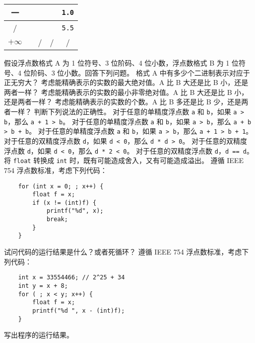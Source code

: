 \begin{problems}
\begin{table}[H]
\begin{tabular}{|c|c|c|c|c|}
				一 &  &  &  & \texttt{1.0} \\ \hline
				/ &  &  &  & \texttt{5.5} \\ \hline
				$+\infty$ &  & / & / & / \\ \hline
			\end{tabular}
		\end{table}
		\pro 假设浮点数格式 A 为 1 位符号、3 位阶码、4 位小数，浮点数格式 B 为 1 位符号、4 位阶码、3 位小数。回答下列问题。
			\qn 格式 A 中有多少个二进制表示对应于正无穷大？
			\qn 考虑能精确表示的实数的最大绝对值。A 比 B 大还是比 B 小，还是两者一样？
			\qn 考虑能精确表示的实数的最小非零绝对值。A 比 B 大还是比 B 小，还是两者一样？
			\qn 考虑能精确表示的实数的个数。A 比 B 多还是比 B 少，还是两者一样？
		\pro 判断下列说法的正确性。
			\qn 对于任意的单精度浮点数 \texttt{a} 和 \texttt{b}，如果 \texttt{a > b}，那么 \texttt{a + 1 > b}。
			\qn 对于任意的单精度浮点数 \texttt{a} 和 \texttt{b}，如果 \texttt{a > b}，那么 \texttt{a + b > b + b}。
			\qn 对于任意的单精度浮点数 \texttt{a} 和 \texttt{b}，如果 \texttt{a > b}，那么 \texttt{a + 1 > b + 1}。
			\qn 对于任意的双精度浮点数 \texttt{d}，如果 \texttt{d < 0}，那么 \texttt{d * d > 0}。
			\qn 对于任意的双精度浮点数 \texttt{d}，如果 \texttt{d < 0}，那么 \texttt{d * 2 < 0}。
			\qn 对于任意的双精度浮点数 \texttt{d}，\texttt{d == d}。
			\qn 将 \texttt{float} 转换成 \texttt{int} 时，既有可能造成舍入，又有可能造成溢出。
		\pro 遵循 IEEE 754 浮点数标准，考虑下列代码：
		\begin{verbatim}
    for (int x = 0; ; x++) {
        float f = x;
        if (x != (int)f) {
            printf("%d", x);
            break;
        }
    }
		\end{verbatim}
		试问代码的运行结果是什么？或者死循环？
		\pro 遵循 IEEE 754 浮点数标准，考虑下列代码：
		\begin{verbatim}
    int x = 33554466; // 2^25 + 34
    int y = x + 8;
    for ( ; x < y; x++) {
        float f = x;
        printf("%d ", x - (int)f);
    }
		\end{verbatim}
		写出程序的运行结果。
	\end{problems}

